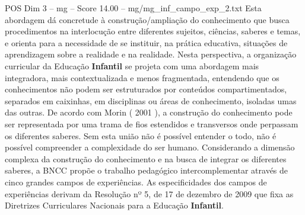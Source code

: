\begin{textsample}{POS Dim 3 – mg – Score 14.00 – mg/mg\_inf\_campo\_exp\_2.txt}  \label{ex:f3_pos_270}
Esta abordagem dá concretude à construção/ampliação do conhecimento que busca procedimentos na interlocução entre diferentes sujeitos, ciências, saberes e temas, e orienta para a necessidade de se instituir, na prática educativa, situações de aprendizagem sobre a realidade e na realidade.
Nesta perspectiva, a organização curricular da Educação \textbf{Infantil} se projeta com uma abordagem mais integradora, mais contextualizada e menos fragmentada, entendendo que os conhecimentos não podem ser estruturados por conteúdos compartimentados, separados em caixinhas, em disciplinas ou áreas de conhecimento, isoladas umas das outras.
De acordo com Morin ( 2001 ), a construção do conhecimento pode ser representada por uma trama de fios estendidos e transversos onde perpassam os diferentes saberes.
Sem esta união não é possível entender o todo, não é possível compreender a complexidade do ser humano.
Considerando a dimensão complexa da construção do conhecimento e na busca de integrar os diferentes saberes, a BNCC propõe o trabalho pedagógico intercomplementar através de cinco grandes campos de experiências.
As especificidades dos campos de experiências derivam da Resolução nº 5, de 17 de dezembro de 2009 que fixa as Diretrizes Curriculares Nacionais para a Educação \textbf{Infantil}.

\end{textsample}
